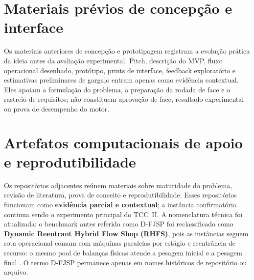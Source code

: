 \documentclass[
  12pt,
  oneside,
  a4paper,
  sumario=tradicional,
  brazil
]{abntex2}
\begin{document}
\begin{apendicesenv}
\section{Materiais prévios de concepção e interface}

Os materiais anteriores de concep\c{c}\~ao e prototipagem registram a evolu\c{c}\~ao pr\'atica da ideia antes da avalia\c{c}\~ao experimental. Pitch, descri\c{c}\~ao do MVP, fluxo operacional desenhado, prot\'otipo, prints de interface, feedback explorat\'orio e estimativas preliminares de gargalo entram apenas como evid\^encia contextual. Eles apoiam a formula\c{c}\~ao do problema, a prepara\c{c}\~ao da rodada de face e o rastreio de requisitos; n\~ao constituem aprova\c{c}\~ao de face, resultado experimental ou prova de desempenho do motor.

\section{Artefatos computacionais de apoio e reprodutibilidade}\label{sec:artefatos-apoio}

Os reposit\'orios adjacentes re\'unem materiais sobre maturidade do problema, revis\~ao de literatura, prova de conceito e reprodutibilidade. Esses reposit\'orios funcionam como \textbf{evid\^encia parcial e contextual}; a inst\^ancia confirmat\'oria continua sendo o experimento principal do TCC~II. A nomenclatura t\'ecnica foi atualizada: o benchmark antes referido como D-FJSP foi reclassificado como \textbf{Dynamic Reentrant Hybrid Flow Shop (RHFS)}, pois as inst\^ancias seguem rota operacional comum com m\'aquinas paralelas por est\'agio e reentr\^ancia de recurso: o mesmo pool de balan\c{c}as f\'isicas atende a pesagem inicial e a pesagem final \parencite{ruizHybridFlowShop2010, ribasReviewClassificationHybrid2010, gravesSchedulingReentrantFlow1983}. O termo D-FJSP permanece apenas em nomes hist\'oricos de reposit\'orio ou arquivo.


\end{apendicesenv}
\end{document}
